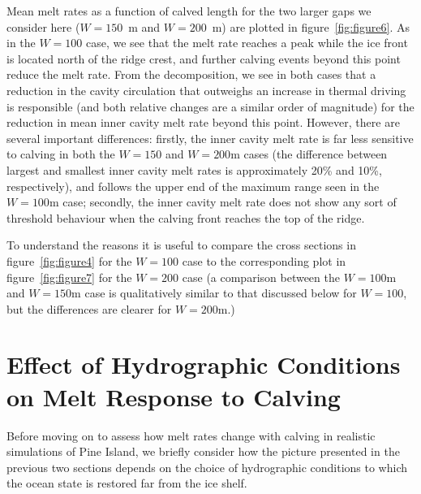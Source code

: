 \documentclass[draft]{agujournal2019}
\begin{document}
Mean melt rates as a function of calved length for the two larger gaps we consider here ($W = 150$~m and $W = 200$~m) are plotted in figure~\ref{fig:figure6}. As in the $W = 100$ case, we see that the melt rate reaches a peak while the ice front is located north of the ridge crest, and further calving events beyond this point reduce the melt rate. From the decomposition, we see in both cases that a reduction in the cavity circulation that outweighs an increase in thermal driving is responsible (and both relative changes are a similar order of magnitude) for the reduction in mean inner cavity melt rate beyond this point.  However, there are several important differences: firstly, the inner cavity melt rate is far less sensitive to calving in both the $W = 150$ and $W = 200$m cases (the difference between largest and smallest inner cavity melt rates is approximately 20\% and 10\%, respectively), and follows the upper end of the maximum range seen in the $W = 100$m case; secondly, the inner cavity melt rate does not show any sort of threshold behaviour when the calving front reaches the top of the ridge.

To understand the reasons it is useful to compare the cross sections in figure~\ref{fig:figure4} for the $W = 100$ case to the corresponding plot in figure~\ref{fig:figure7} for the $W = 200$ case (a comparison between the $W = 100$m and $W = 150$m case is qualitatively similar to that discussed below for $W = 100$, but the differences are clearer for $W = 200$m.)
%


\section{Effect of Hydrographic Conditions on Melt Response to Calving}\label{S:Results:P}
Before moving on to assess how melt rates change with calving in realistic simulations of Pine Island, we briefly consider how the picture presented in the previous two sections depends on the choice of hydrographic conditions to which the ocean state is restored far from the ice shelf.
\end{document}

